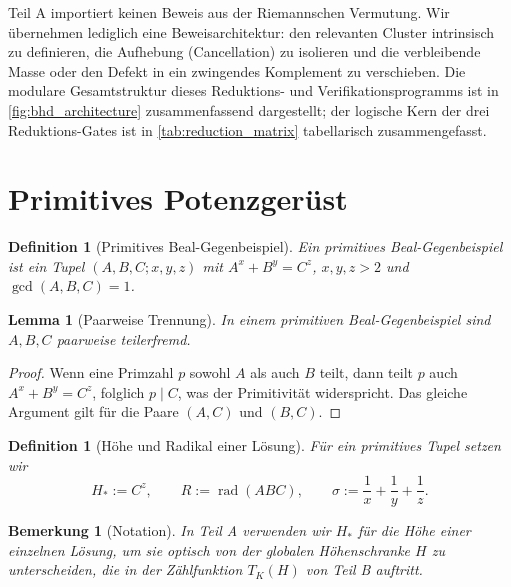 \documentclass[11pt,a4paper]{article}
\DeclareMathOperator{\rad}{rad}
\newtheorem{lemma}[theorem]{Lemma}
\newtheorem{definition}[theorem]{Definition}
\newtheorem{remark}[theorem]{Bemerkung}
\begin{document}
Teil A importiert keinen Beweis aus der Riemannschen Vermutung. Wir übernehmen lediglich eine Beweisarchitektur: den relevanten Cluster intrinsisch zu definieren, die Aufhebung (Cancellation) zu isolieren und die verbleibende Masse oder den Defekt in ein zwingendes Komplement zu verschieben. Die modulare Gesamtstruktur dieses Reduktions- und Verifikationsprogramms ist in \cref{fig:bhd_architecture} zusammenfassend dargestellt; der logische Kern der drei Reduktions-Gates ist in \cref{tab:reduction_matrix} tabellarisch zusammengefasst.

\section{Primitives Potenzgerüst}

\begin{definition}[Primitives Beal-Gegenbeispiel]
Ein primitives Beal-Gegenbeispiel ist ein Tupel $(A,B,C;x,y,z)$ mit $A^x+B^y=C^z$, $x,y,z>2$ und $\gcd(A,B,C)=1$.
\end{definition}

\begin{lemma}[Paarweise Trennung]
\label{lem:pairwise}
In einem primitiven Beal-Gegenbeispiel sind $A,B,C$ paarweise teilerfremd.
\end{lemma}

\begin{proof}
Wenn eine Primzahl $p$ sowohl $A$ als auch $B$ teilt, dann teilt $p$ auch $A^x+B^y=C^z$, folglich $p \mid C$, was der Primitivität widerspricht. Das gleiche Argument gilt für die Paare $(A,C)$ und $(B,C)$.
\end{proof}

\begin{definition}[Höhe und Radikal einer Lösung]
Für ein primitives Tupel setzen wir
\[
  H_* := C^z, \qquad R := \rad(ABC), \qquad
  \sigma := \frac1x+\frac1y+\frac1z.
\]
\end{definition}

\begin{remark}[Notation]
In Teil A verwenden wir $H_*$ für die Höhe einer einzelnen Lösung, um sie optisch von der globalen Höhenschranke $H$ zu unterscheiden, die in der Zählfunktion $T_K(H)$ von Teil B auftritt.
\end{remark}
\end{document}
